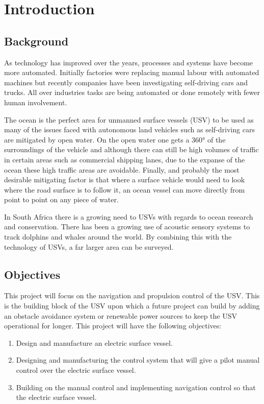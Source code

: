 \chapter{Introduction}
\section{Background}
As technology has improved over the years, processes and systems have become more automated. Initially factories were replacing manual labour with automated machines but recently companies have been investigating self-driving cars and trucks. All over industries tasks are being automated or done remotely with fewer human involvement. \par
\vspace{0.6cm}
The ocean is the perfect area for unmanned surface vessels (USV) to be used as many of the issues faced with autonomous land vehicles such as self-driving cars are mitigated by open water. On the open water one gets a 360° of the surroundings of the vehicle and although there can still be high volumes of traffic in certain areas such as commercial shipping lanes, due to the expanse of the ocean these high traffic areas are avoidable. Finally, and probably the most desirable mitigating factor is that where a surface vehicle would need to look where the road surface is to follow it, an ocean vessel can move directly from point to point on any piece of water. \par
\vspace{0.6cm}
In South Africa there is a growing need to USVs with regards to ocean research and conservation. There has been a growing use of acoustic sensory systems to track dolphins and whales around the world. By combining this with the technology of USVs, a far larger area can be surveyed. \par
\section{Objectives}
This project will focus on the navigation and propulsion control of the USV. This is the building block of the USV upon which a future project can build by adding an obstacle avoidance system or renewable power sources to keep the USV operational for longer. This project will have the following objectives:
\begin{enumerate}
	\item Design and manufacture an electric surface vessel.
	\item Designing and manufacturing the control system that will give a pilot manual control over the electric surface vessel.
	\item Building on the manual control and implementing navigation control so that the electric surface vessel.
\end{enumerate}
